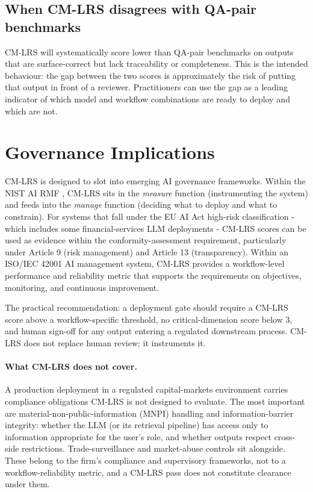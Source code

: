 \documentclass[11pt]{article}
\begin{document}
\subsection{When CM-LRS disagrees with QA-pair benchmarks}

CM-LRS will systematically score lower than QA-pair benchmarks on outputs that are surface-correct but lack traceability or completeness. This is the intended behaviour: the gap between the two scores is approximately the risk of putting that output in front of a reviewer. Practitioners can use the gap as a leading indicator of which model and workflow combinations are ready to deploy and which are not.

\section{Governance Implications}
\label{sec:governance}

CM-LRS is designed to slot into emerging AI governance frameworks. Within the NIST AI RMF \citep{nistairmf2023}, CM-LRS sits in the \emph{measure} function (instrumenting the system) and feeds into the \emph{manage} function (deciding what to deploy and what to constrain). For systems that fall under the EU AI Act \citep{euaiact2024} high-risk classification - which includes some financial-services LLM deployments - CM-LRS scores can be used as evidence within the conformity-assessment requirement, particularly under Article 9 (risk management) and Article 13 (transparency). Within an ISO/IEC 42001 \citep{iso420012023} AI management system, CM-LRS provides a workflow-level performance and reliability metric that supports the requirements on objectives, monitoring, and continuous improvement.

The practical recommendation: a deployment gate should require a CM-LRS score above a workflow-specific threshold, no critical-dimension score below 3, and human sign-off for any output entering a regulated downstream process. CM-LRS does not replace human review; it instruments it.

\paragraph{What CM-LRS does not cover.} A production deployment in a regulated capital-markets environment carries compliance obligations CM-LRS is not designed to evaluate. The most important are material-non-public-information (MNPI) handling and information-barrier integrity: whether the LLM (or its retrieval pipeline) has access only to information appropriate for the user's role, and whether outputs respect cross-side restrictions. Trade-surveillance and market-abuse controls sit alongside. These belong to the firm's compliance and supervisory frameworks, not to a workflow-reliability metric, and a CM-LRS pass does not constitute clearance under them.
\end{document}
